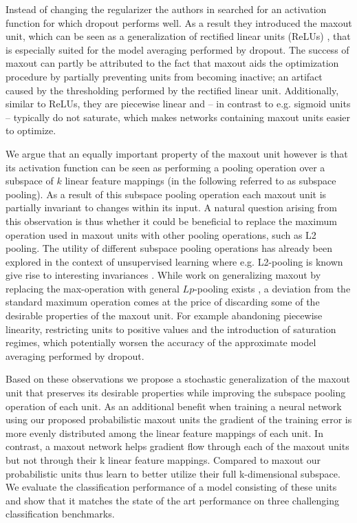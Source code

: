 \documentclass{article} \pdfoutput=1
\begin{document}
Instead of changing the regularizer the authors in
\cite{Goodfellow2013} searched for an activation function for which
dropout performs well. As a result they introduced the maxout unit,
which can be seen as a generalization of rectified linear units
(ReLUs) \cite{Nair2010,Glorot2011}, that is especially suited for the
model averaging performed by dropout. The success of maxout can partly
be attributed to the fact that maxout aids the optimization procedure
by partially preventing units from becoming inactive; an artifact
caused by the thresholding performed by the rectified linear
unit. Additionally, similar to ReLUs, they are piecewise linear
and -- in contrast to e.g. sigmoid units -- typically do not saturate,
which makes networks containing maxout units easier to optimize.


We argue that an equally important property of the maxout unit however
is that its activation function can be seen as performing a pooling
operation over a subspace of $k$ linear feature mappings (in the
following referred to as subspace pooling). As a result of this
subspace pooling operation each maxout unit is partially invariant to
changes within its input. A natural question arising from this
observation is thus whether it could be beneficial to replace the
maximum operation used in maxout units with other pooling operations,
such as L2 pooling. The utility of different subspace pooling
operations has already been explored in the context of unsupervised
learning where e.g. L2-pooling is known give rise to interesting
invariances \cite{Hyvarinnen2009,Bergstra2009,Zou2012}. While work on
generalizing maxout by replacing the max-operation with general
$Lp$-pooling exists \cite{Gulcere2013}, a deviation from the standard
maximum operation comes at the price of discarding some of the
desirable properties of the maxout unit. For example abandoning piecewise
linearity, restricting units to positive values and the introduction
of saturation regimes, which potentially worsen the accuracy of the
approximate model averaging performed by dropout.

Based on these observations we propose a stochastic generalization of
the maxout unit that preserves its desirable properties while
improving the subspace pooling operation of each unit. As an
additional benefit when training a neural network using our proposed
probabilistic maxout units the gradient of the training error is more
evenly distributed among the linear feature mappings of each unit. In
contrast, a maxout network helps gradient flow through each of the
maxout units but not through their k linear feature mappings.
Compared to maxout our probabilistic units thus learn to better
utilize their full k-dimensional subspace. We evaluate the
classification performance of a model consisting of these units and
show that it matches the state of the art performance on three
challenging classification benchmarks.
\end{document}
